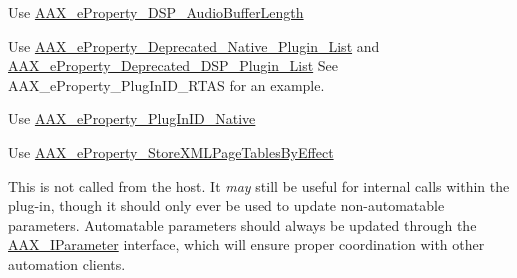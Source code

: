 \begin{DoxyRefList}
\item[Member \mbox{\hyperlink{a00737_a13e384f22825afd3db6d68395b79ce0da34b1ae8c8edd3080aee6cd677bed9611}{AAX\+\_\+e\+Property\+\_\+\+Audio\+Buffer\+Length}} ]\label{a00881__deprecated000018}%
%
Use \mbox{\hyperlink{a00737_a13e384f22825afd3db6d68395b79ce0da09fbd1cbcae0e86ad81005258dc1b67e}{AAX\+\_\+e\+Property\+\_\+\+DSP\+\_\+\+Audio\+Buffer\+Length}}  
\item[Member \mbox{\hyperlink{a00737_a13e384f22825afd3db6d68395b79ce0da2414ef0c66df40f47ec8f8092de3b94a}{AAX\+\_\+e\+Property\+\_\+\+Deprecated\+\_\+\+Plugin\+\_\+\+List}} ]\label{a00881__deprecated000017}%
%
Use \mbox{\hyperlink{a00737_a13e384f22825afd3db6d68395b79ce0da3f1e690c987d601001a7cc1da8247399}{AAX\+\_\+e\+Property\+\_\+\+Deprecated\+\_\+\+Native\+\_\+\+Plugin\+\_\+\+List}} and \mbox{\hyperlink{a00737_a13e384f22825afd3db6d68395b79ce0dab102bc794f2770c14b1f0fe2dde6766a}{AAX\+\_\+e\+Property\+\_\+\+Deprecated\+\_\+\+DSP\+\_\+\+Plugin\+\_\+\+List}} See AAX\+\_\+e\+Property\+\_\+\+Plug\+In\+ID\+\_\+\+RTAS for an example.  
\item[Member \mbox{\hyperlink{a00737_a13e384f22825afd3db6d68395b79ce0da01880753b83fc0a40d99a5381301a9cf}{AAX\+\_\+e\+Property\+\_\+\+Plug\+In\+ID\+\_\+\+RTAS}} ]\label{a00881__deprecated000016}%
%
Use \mbox{\hyperlink{a00737_a13e384f22825afd3db6d68395b79ce0da89ca3dd6e96895cda14976c1b1ceb826}{AAX\+\_\+e\+Property\+\_\+\+Plug\+In\+ID\+\_\+\+Native}}  
\item[Member \mbox{\hyperlink{a00737_a13e384f22825afd3db6d68395b79ce0dae555ac90959bcee0301eed22dff52b03}{AAX\+\_\+e\+Property\+\_\+\+Store\+XMLPage\+Tables\+By\+Type}} ]\label{a00881__deprecated000019}%
%
Use \mbox{\hyperlink{a00737_a13e384f22825afd3db6d68395b79ce0da1837e77c3a427004ac44714a8c9cbad9}{AAX\+\_\+e\+Property\+\_\+\+Store\+XMLPage\+Tables\+By\+Effect}}  
\item[Member \mbox{\hyperlink{a02068_a54403bec090fcc999a93f54c01bca0c9}{AAX\+\_\+\+IACFEffect\+Parameters\+::Update\+Parameter\+Normalized\+Relative}} (AAX\+\_\+\+CParam\+ID i\+Parameter\+ID, double i\+Value)=0]\label{a00881__deprecated000014}%
%
This is not called from the host. It {\itshape may} still be useful for internal calls within the plug-\/in, though it should only ever be used to update non-\/automatable parameters. Automatable parameters should always be updated through the \mbox{\hyperlink{a02304}{AAX\+\_\+\+IParameter}} interface, which will ensure proper coordination with other automation clients. 

\end{DoxyRefList}

